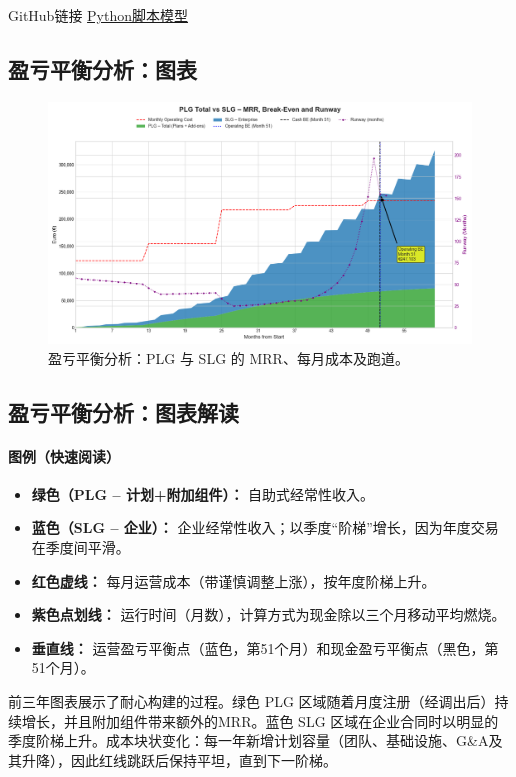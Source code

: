 \documentclass[11点, A4纸, 单面]{article}
\begin{document}
GitHub链接 \href{https://github.com/kuduk/intellyhub-businessplan/blob/main/breakeven.v2.02.py}{Python脚本模型}

\newpage
\subsection{盈亏平衡分析：图表}
\begin{figure}[H]
    \centering 
    \includegraphics[width=\textwidth]{financial_projection.png}
    \caption{盈亏平衡分析：PLG 与 SLG 的 MRR、每月成本及跑道。}
    \label{fig:break_even_analysis}
\end{figure} 
\subsection{盈亏平衡分析：图表解读}

\paragraph{图例（快速阅读）}
\begin{itemize}
  \item \textbf{绿色（PLG -- 计划+附加组件）：} 自助式经常性收入。
  \item \textbf{蓝色（SLG -- 企业）：} 企业经常性收入；以季度“阶梯”增长，因为年度交易在季度间平滑。
  \item \textbf{红色虚线：} 每月运营成本（带谨慎调整上涨），按年度阶梯上升。
  \item \textbf{紫色点划线：} 运行时间（月数），计算方式为现金除以三个月移动平均燃烧。
  \item \textbf{垂直线：} 运营盈亏平衡点（蓝色，第51个月）和现金盈亏平衡点（黑色，第51个月）。
\end{itemize}

前三年图表展示了耐心构建的过程。绿色 PLG 区域随着月度注册（经调出后）持续增长，并且附加组件带来额外的MRR。蓝色 SLG 区域在企业合同时以明显的季度阶梯上升。成本块状变化：每一年新增计划容量（团队、基础设施、G\&A及其升降），因此红线跳跃后保持平坦，直到下一阶梯。
\end{document}
